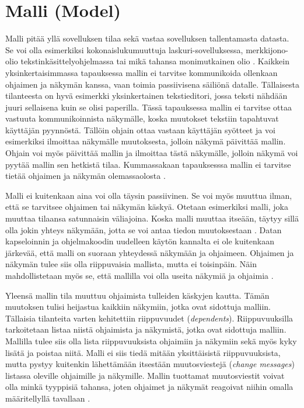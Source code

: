 \documentclass[utf8]{gradu3}
\begin{document}
\section{Malli (Model)}
Malli pitää yllä sovelluksen tilaa sekä vastaa sovelluksen tallentamasta datasta. Se voi olla esimerkiksi kokonaislukumuuttuja laskuri-sovelluksessa, merkkijono-olio tekstinkäsittelyohjelmassa tai
mikä tahansa monimutkainen olio \parencite[s. 3]{krasner_desc}. Kaikkein yksinkertaisimmassa tapauksessa mallin ei tarvitse kommunikoida ollenkaan ohjaimen ja näkymän kanssa, vaan toimia passiivisena säiliönä datalle.
Tällaisesta tilanteesta on hyvä esimerkki yksinkertainen tekstieditori, jossa teksti nähdään juuri sellaisena kuin se olisi paperilla. Tässä tapauksessa mallin ei tarvitse ottaa vastuuta
kommunikoinnista näkymälle, koska muutokset tekstiin tapahtuvat käyttäjän pyynnöstä. Tällöin ohjain ottaa vastaan käyttäjän syötteet ja voi esimerkiksi ilmoittaa näkymälle muutoksesta, jolloin näkymä
päivittää mallin. Ohjain voi myös päivittää mallin ja ilmoittaa tästä näkymälle, jolloin näkymä voi pyytää mallin sen hetkistä tilaa. Kummassakaan tapauksesssa mallin ei tarvitse tietää ohjaimen ja näkymän
olemassaolosta \parencite{burbeck}.

Malli ei kuitenkaan aina voi olla täysin passiivinen. Se voi myös muuttua ilman, että se tarvitsee ohjaimen tai näkymän käskyä. Otetaan esimerkiksi malli, joka muuttaa tilaansa satunnaisin väliajoina. Koska malli muuttaa itseään, täytyy sillä olla jokin yhteys näkymään, jotta se voi antaa tiedon muutoksestaan \parencite{burbeck}. Datan kapseloinnin ja ohjelmakoodin uudelleen käytön kannalta ei ole kuitenkaan järkevää, että malli on suoraan yhteydessä näkymään ja ohjaimeen. Ohjaimen ja näkymän tulee siis olla riippuvaisia mallista, mutta ei toisinpäin. Näin mahdollistetaan myös se, että mallilla voi olla useita näkymiä ja ohjaimia \parencite[s. 4]{krasner_desc}.

Yleensä mallin tila muuttuu ohjaimista tulleiden käskyjen kautta. Tämän muutoksen tulisi heijastua kaikkiin näkymiin, jotka ovat sidottuja malliin. Tällaisia tilanteita varten kehitettiin riippuvuudet (\emph{dependents}).
Riippuvuuksilla tarkoitetaan listaa niistä ohjaimista ja näkymistä, jotka ovat sidottuja malliin. Mallilla tulee siis olla lista riippuvuuksista ohjaimiin ja näkymiin sekä myös kyky lisätä ja poistaa niitä. Malli ei siis tiedä mitään yksittäisistä riippuvuuksista, mutta pystyy kuitenkin lähettämään itsestään muutosviestejä (\emph{change messages}) listassa oleville ohjaimille ja näkymille. Mallin tuottamat muutosviestit voivat olla minkä tyyppisiä tahansa, joten ohjaimet ja näkymät reagoivat niihin omalla määritellyllä tavallaan  \parencite[s.2-3]{krasner}.
\end{document}
